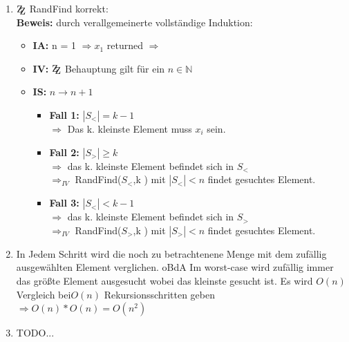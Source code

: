 \documentclass[10pt,a4paper]{article}
\newcommand{\zz}{\mathrm{Z\kern-.3em\raise-0.5ex\hbox{Z}}}
\begin{document}
    \begin{enumerate}[label={\alph*)}]
        \item $\zz$ RandFind korrekt: \\
        \textbf{Beweis: } durch verallgemeinerte vollständige Induktion: \\
        \begin{itemize}
            \item \textbf{IA:} n = 1 $\Rightarrow x_1$ returned $\Rightarrow $ \checkmark
            \item \textbf{IV:} $\zz$ Behauptung gilt für ein $n \in \mathbb{N}$
            \item \textbf{IS: } $n \rightarrow n + 1$ \\
                \begin{itemize}
                    \item \textbf{Fall 1:} $| S_<| = k-1$ \\
                        $\Rightarrow$ Das k. kleinste Element muss $x_i$ sein.
                    \item \textbf{Fall 2:} $|S_>| \geq k$ \\
                        $\Rightarrow $ das k. kleinste Element befindet sich in $S_<$\\
                        $\Rightarrow_{IV} $ RandFind($S_<$,k ) mit $|S_<| < n$ findet gesuchtes Element.
                    \item \textbf{Fall 3:} $|S_<| < k-1$ \\
                        $\Rightarrow$ das k. kleinste Element befindet sich in $S_>$\\
                        $\Rightarrow_{IV}$ RandFind($S_>$,k ) mit $|S_>| < n$ findet gesuchtes Element.
                \end{itemize}

        \end{itemize}
        
        \item
            In Jedem Schritt wird die noch zu betrachtenene Menge mit dem zufällig ausgewählten
            Element verglichen. oBdA Im worst-case wird zufällig immer das größte Element ausgesucht wobei
            das kleinste gesucht ist. Es wird $O(n)$ Vergleich bei$ O(n)$ Rekursionsschritten geben
            $\Rightarrow O(n)*O(n)= O(n^2)$
            
        \item TODO...
    \end{enumerate}
\end{document}
